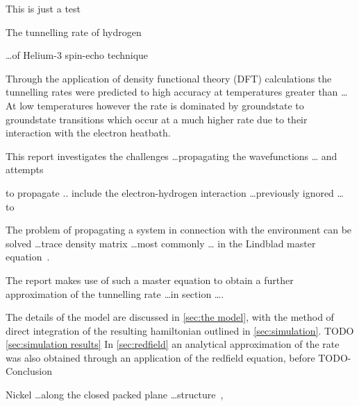 
This is just a test

The tunnelling rate of
hydrogen

\ldots of Helium-3 spin-echo
technique~\cite{Helium_spin_echo}

Through the application of
density functional theory (DFT)
calculations the tunnelling
rates were predicted to high
accuracy at temperatures greater
than \ldots\cite{Jianding-Zhu}
At low temperatures however
the rate is dominated
by groundstate to groundstate
transitions which occur
at a much higher rate due to
their interaction with the
electron heatbath.

This report investigates
the challenges
\ldots propagating the
wavefunctions \ldots
and attempts

to propagate
..
include the electron-hydrogen
interaction \ldots previously ignored \ldots
to

The problem of propagating
a system in connection with
the environment can
be solved \ldots trace density matrix
\ldots most commonly \ldots
in the Lindblad master
equation~\cite{Manzano_2020}.

The report makes
use of such a master equation
to obtain a further
approximation of the
tunnelling rate \ldots in section \ldots.




The details of the model
are discussed in \cref{sec:the model},
with the method of
direct integration of the
resulting hamiltonian outlined
in \cref{sec:simulation}.
TODO \cref{sec:simulation results}
In \cref{sec:redfield} an
analytical approximation
of the rate was also obtained
through an application
of the redfield equation,
before TODO-Conclusion



Nickel \ldots along the closed packed plane \ldots structure~\cite{Jianding-Zhu},